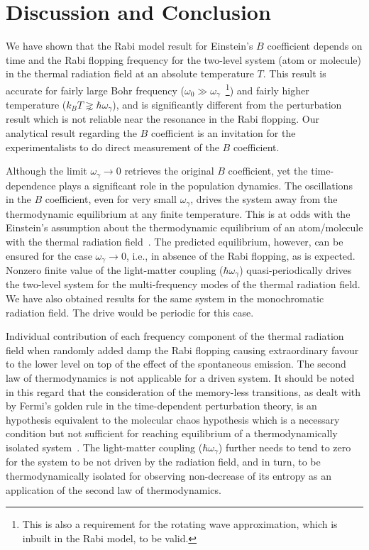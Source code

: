 \documentclass[aps,pra,twocolumn,showpacs,preprintnumbers,amsmath,amssymb,footinbib]{revtex4}
\begin{document}
\section{Discussion and Conclusion}
We have shown that the Rabi model result for Einstein's $B$ coefficient depends on time and the Rabi flopping frequency for the two-level system (atom or molecule) in the thermal radiation field at an absolute temperature $T$. This result is accurate for fairly large Bohr frequency ($\omega_0\gg\omega_\gamma$~\footnote{This is also a requirement for the rotating wave approximation, which is inbuilt in the Rabi model, to be valid.}) and fairly higher temperature ($k_BT\gnsim \hbar\omega_\gamma$), and is significantly different from the perturbation result which is not reliable near the resonance in the Rabi flopping. Our analytical result regarding the $B$ coefficient is an invitation for the experimentalists to do direct measurement of the $B$ coefficient. 

Although the limit $\omega_\gamma\rightarrow0$ retrieves the original $B$ coefficient, yet the time-dependence plays a significant role in the population dynamics. The oscillations in the $B$ coefficient, even for very small $\omega_\gamma$, drives the system away from the thermodynamic equilibrium at any finite temperature. This is at odds with the Einstein's assumption about the thermodynamic equilibrium of an atom/molecule with the thermal radiation field~\cite{Einstein}. The predicted equilibrium, however, can be ensured for the case $\omega_\gamma\rightarrow0$, i.e., in absence of the Rabi flopping, as is expected. Nonzero finite value of the light-matter coupling ($\hbar\omega_\gamma$) quasi-periodically drives the two-level system for the multi-frequency modes of the thermal radiation field. We have also obtained results for the same system in the monochromatic radiation field. The drive would be periodic for this case. 

Individual contribution of each frequency component of the thermal radiation field when randomly added damp the Rabi flopping causing extraordinary favour to the lower level on top of the effect of the spontaneous emission. The second law of thermodynamics is not applicable for a driven system. It should be noted in this regard that the consideration of the memory-less transitions, as dealt with by Fermi's golden rule in the time-dependent perturbation theory, is an hypothesis equivalent to the molecular chaos hypothesis which is a necessary condition but not sufficient for reaching equilibrium of a thermodynamically isolated system~\cite{Snoke,Das}. The light-matter coupling ($\hbar\omega_\gamma$) further needs to tend to zero for the system to be not driven by the radiation field, and in turn, to be thermodynamically isolated for observing non-decrease of its entropy as an application of the second law of thermodynamics.
\end{document}
